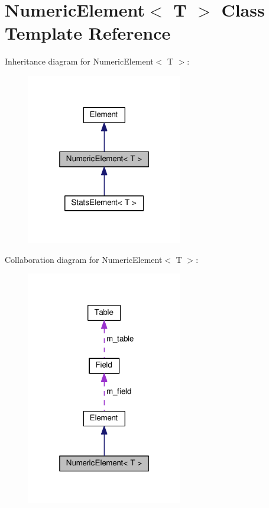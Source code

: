 \hypertarget{classNumericElement}{}\section{Numeric\+Element$<$ T $>$ Class Template Reference}
\label{classNumericElement}


Inheritance diagram for Numeric\+Element$<$ T $>$\+:
\nopagebreak
\begin{figure}[H]
\begin{center}
\leavevmode
\includegraphics[width=193pt]{classNumericElement__inherit__graph}
\end{center}
\end{figure}


Collaboration diagram for Numeric\+Element$<$ T $>$\+:
\nopagebreak
\begin{figure}[H]
\begin{center}
\leavevmode
\includegraphics[width=193pt]{classNumericElement__coll__graph}
\end{center}
\end{figure}
